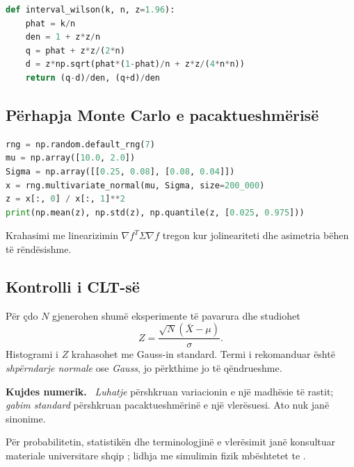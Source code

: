 \documentclass[11pt,oneside,openany]{book}
\newenvironment{kujdes}{\par\medskip\noindent\textbf{Kujdes numerik.}\ }{\par\medskip}
\begin{document}
\begin{lstlisting}[language=Python]
def interval_wilson(k, n, z=1.96):
    phat = k/n
    den = 1 + z*z/n
    q = phat + z*z/(2*n)
    d = z*np.sqrt(phat*(1-phat)/n + z*z/(4*n*n))
    return (q-d)/den, (q+d)/den
\end{lstlisting}

\subsection{Përhapja Monte Carlo e pacaktueshmërisë}
\begin{lstlisting}[language=Python,caption={Përhapja e hyrjeve të korreluara.}]
rng = np.random.default_rng(7)
mu = np.array([10.0, 2.0])
Sigma = np.array([[0.25, 0.08], [0.08, 0.04]])
x = rng.multivariate_normal(mu, Sigma, size=200_000)
z = x[:, 0] / x[:, 1]**2
print(np.mean(z), np.std(z), np.quantile(z, [0.025, 0.975]))
\end{lstlisting}
Krahasimi me linearizimin $\nabla f^T\Sigma\nabla f$ tregon kur jolineariteti dhe asimetria bëhen të rëndësishme.

\subsection{Kontrolli i CLT-së}
Për çdo $N$ gjenerohen shumë eksperimente të pavarura dhe studiohet
\begin{equation}
 Z=\frac{\sqrt N(\bar X-\mu)}{\sigma}.
\end{equation}
Histogrami i $Z$ krahasohet me Gauss-in standard. Termi i rekomanduar është \emph{shpërndarje normale} ose \emph{Gauss}, jo përkthime jo të qëndrueshme.

\begin{kujdes}
\emph{Luhatje} përshkruan variacionin e një madhësie të rastit; \emph{gabim standard} përshkruan pacaktueshmërinë e një vlerësuesi. Ato nuk janë sinonime.
\end{kujdes}

Për probabilitetin, statistikën dhe terminologjinë e vlerësimit janë konsultuar materiale universitare shqip \cite{capollari,butka,tasho}; lidhja me simulimin fizik mbështetet te \cite{newman,landau}.



\end{document}

